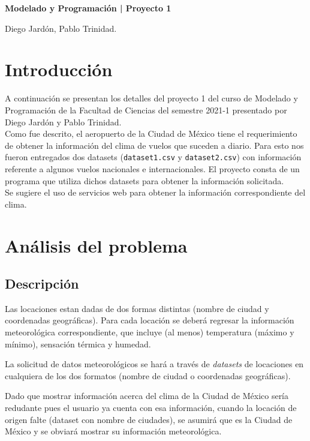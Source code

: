 \documentclass[10pt, letterpaper]{article}
\begin{document}
\begin{center}
    {\large \bfseries Modelado y Programación | Proyecto 1 \par}
    \vspace{0.2cm}
    Diego Jardón, Pablo Trinidad.
\end{center}

\section{Introducción}

A continuación se presentan los detalles del proyecto 1 del curso de Modelado y Programación
de la Facultad de Ciencias del semestre 2021-1 presentado por Diego Jardón y Pablo Trinidad.\\

Como fue descrito, el aeropuerto de la Ciudad de México tiene el requerimiento de obtener la
información del clima de vuelos que suceden a diario. Para esto nos fueron entregados dos datasets
(\texttt{dataset1.csv} y \texttt{dataset2.csv}) con información referente a algunos vuelos nacionales
e internacionales. El proyecto consta de un programa que utiliza dichos datasets para obtener la
información solicitada.\\

Se sugiere el uso de servicios web para obtener la información correspondiente del clima.

\section{Análisis del problema}

\subsection{Descripción}

Las locaciones estan dadas de dos formas distintas (nombre de ciudad y coordenadas geográficas).
Para cada locación se deberá regresar la información meteorológica correspondiente, que incluye (al menos)
temperatura (máximo y mínimo), sensación térmica y humedad.

La solicitud de datos meteorológicos se hará a través de \emph{datasets} de locaciones en cualquiera de los dos formatos (nombre de ciudad o coordenadas geográficas).

Dado que mostrar información acerca del clima de la Ciudad de México sería redudante pues el usuario ya cuenta con esa información, cuando la
locación de origen falte (dataset con nombre de ciudades), se asumirá que es la Ciudad de México y se obviará mostrar su información meteorológica.
\end{document}
